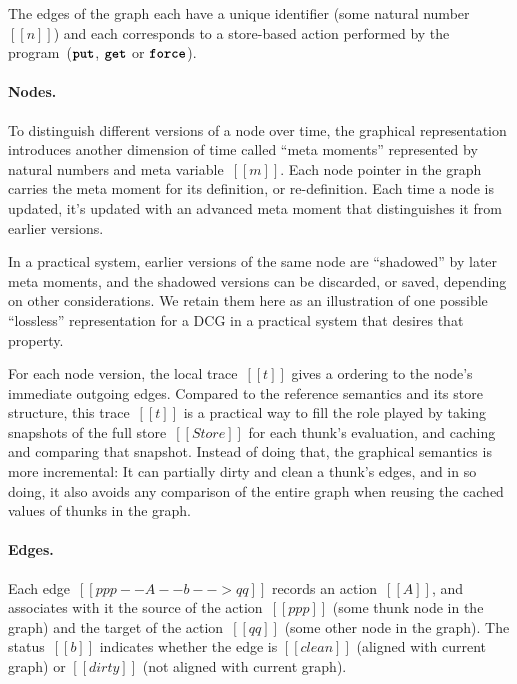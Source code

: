 \documentclass[11pt]{article}
\renewcommand{\ottkw}[1]{\textbf{\texttt{#1}}}
\begin{document}
The edges of the graph each have a unique identifier (some natural number~$[[n]]$) and each corresponds to a store-based action performed by the program~($\ottkw{put}$, $\ottkw{get}$ or $\ottkw{force}$).
  
\ottgrammartabular{
  \ottGraph
}


\ottgrammartabular{
  \ottppp
}

\paragraph{Nodes.}
To distinguish different versions of a node over time,
the graphical representation introduces another dimension of time called ``meta moments''
represented by natural numbers and meta variable~$[[m]]$.
%
Each node pointer in the graph carries the meta moment for its definition, or re-definition.
%
Each time a node is updated, it's updated with an advanced meta moment that distinguishes it from earlier versions.

In a practical system, earlier versions of the same node are
``shadowed'' by later meta moments, and the shadowed versions can be
discarded, or saved, depending on other considerations.
%
We retain them here as an illustration of one possible ``lossless'' representation for a DCG in a practical system that desires that property.

For each node version, the local trace~$[[t]]$ gives a ordering to the node's immediate outgoing edges.
%
Compared to the reference semantics and its store structure, this
trace~$[[t]]$ is a practical way to fill the role played by taking
snapshots of the full store~$[[Store]]$ for each thunk's evaluation,
and caching and comparing that snapshot.
%
Instead of doing that, the graphical semantics is more incremental:
It can partially dirty and clean a thunk's edges, and in so doing, it also avoids any comparison of the entire graph
when reusing the cached values of thunks in the graph.

\ottgrammartabular{
  \ottnode
  \\
  \ottcache
  \\
  \ottt
}

\paragraph{Edges.}
Each edge~$[[ppp --A--b--> qq]]$ records an action~$[[A]]$, and
associates with it the source of the action~$[[ppp]]$ (some thunk node
in the graph) and the target of the action~$[[qq]]$ (some other node
in the graph).
%
The status~$[[b]]$ indicates whether the edge is $[[clean]]$ (aligned
with current graph) or $[[dirty]]$ (not aligned with current graph).
\end{document}

